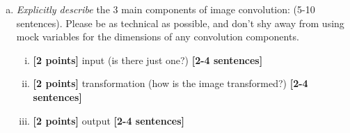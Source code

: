 \documentclass[11pt]{article}
\begin{document}
\begin{enumerate}[(a)]
\item 
\begin{tcolorbox}[colback=orange!5!white,colframe=orange!75!black]
\emph{Explicitly describe} the 3 main components of image convolution: (5-10 sentences). Please be as technical as possible, and don't shy away from using mock variables for the dimensions of any convolution components.
\end{tcolorbox}
\begin{enumerate}[(i)]
    \item \textbf{[2 points]} input (is there just one?) \textbf{[2-4 sentences]}
    
    \item \textbf{[2 points]} transformation (how is the image transformed?) \textbf{[2-4 sentences]} 
    
    \item \textbf{[2 points]} output \textbf{[2-4 sentences]}
\end{enumerate}
\end{enumerate}
\end{document}
